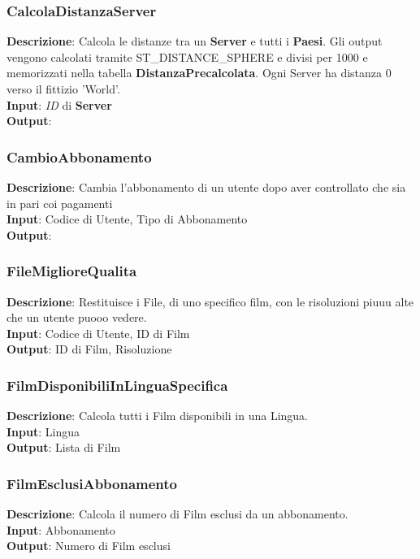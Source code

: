 \documentclass{article}
\begin{document}
\subsubsection{CalcolaDistanzaServer}
\textbf{Descrizione}: Calcola le distanze tra un \textbf{Server} e tutti i \textbf{Paesi}. Gli output vengono calcolati tramite ST\_DISTANCE\_SPHERE e divisi per 1000 e memorizzati nella tabella \textbf{DistanzaPrecalcolata}. Ogni Server ha distanza 0 verso il fittizio 'World'.\\
\textbf{Input}: \textit{ID} di \textbf{Server}\\
\textbf{Output}: \\
\subsubsection{CambioAbbonamento}
\textbf{Descrizione}: Cambia l'abbonamento di un utente dopo aver controllato che sia in pari coi pagamenti\\
\textbf{Input}: Codice di Utente, Tipo di Abbonamento \\ 
\textbf{Output}: \\
\subsubsection{FileMiglioreQualita}
\textbf{Descrizione}: Restituisce i File, di uno specifico film, con le risoluzioni piuuu alte che un utente puooo vedere.\\
\textbf{Input}: Codice di Utente, ID di Film\\
\textbf{Output}: ID di Film, Risoluzione \\
\subsubsection{FilmDisponibiliInLinguaSpecifica}
\textbf{Descrizione}: Calcola tutti i Film disponibili in una Lingua.\\
\textbf{Input}: Lingua \\
\textbf{Output}: Lista di Film \\
\subsubsection{FilmEsclusiAbbonamento}
\textbf{Descrizione}: Calcola il numero di Film esclusi da un abbonamento.\\
\textbf{Input}: Abbonamento \\
\textbf{Output}: Numero di Film esclusi \\
\end{document}

